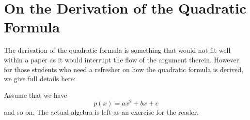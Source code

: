 \documentclass[final,3p,times,twocolumn]{elsarticle}
\begin{document}
\appendix

\section{On the Derivation of the Quadratic Formula}
\label{app:quad}
The derivation of the quadratic formula is something that would not
fit well within a paper as it would interrupt the flow of the argument
therein. However, for those students who need a refresher on how the
quadratic formula is derived, we give full details here:\par
Assume that we have
\begin{equation}
p(x) = ax^2 + bx + c
\end{equation}
and so on. The actual algebra is left as an exercise for the reader.











\end{document}
